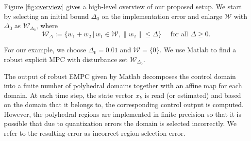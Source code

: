 
	
Figure \ref{fig:overview} gives a high-level overview of our proposed setup.
We start by selecting an initial bound $\Delta_0$ on the implementation error and enlarge $\mathcal W$ with $\Delta_0$ as $\mathcal W_{\Delta_0}$, where
\begin{equation}
\mathcal W_{\Delta} := \{w_1+w_2 \,|\, w_1\in \mathcal W, \|w_2\|\le \Delta\}
\quad\text{ for all } \Delta\ge 0.
\end{equation}
 
For our example, we choose $\Delta_0=0.01$ and $\mathcal W = \{0\}$. 
We use Matlab to find a robust explicit MPC with disturbance set $\mathcal W_{\Delta_0}$. 

The output of robust EMPC given by Matlab decomposes the control domain into a
finite number of polyhedral domains together with an affine map for each domain. At each
time step, the state vector $x_k$ is read (or estimated) and based on the domain
that it belongs to, the corresponding control output is computed. 
However, the polyhedral regions are implemented in finite precision so that
it is possible that due to quantization errors the domain is selected incorrectly.
We refer to the resulting error as incorrect region selection error.

